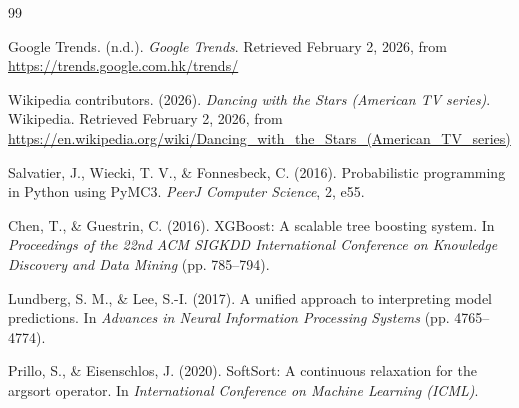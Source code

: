 
\begin{thebibliography}{99}%
\setlength{\itemsep}{0pt}
\setlength{\parsep}{0pt}
\setlength{\parskip}{0pt}

Google Trends. (n.d.). 
\textit{Google Trends}. 
Retrieved February 2, 2026, from \url{https://trends.google.com.hk/trends/}

Wikipedia contributors. (2026). 
\textit{Dancing with the Stars (American TV series)}. 
Wikipedia. Retrieved February 2, 2026, from \url{https://en.wikipedia.org/wiki/Dancing_with_the_Stars_(American_TV_series)}

Salvatier, J., Wiecki, T. V., \& Fonnesbeck, C. (2016).
Probabilistic programming in Python using PyMC3.
\textit{PeerJ Computer Science}, 2, e55.

Chen, T., \& Guestrin, C. (2016).
XGBoost: A scalable tree boosting system.
In \textit{Proceedings of the 22nd ACM SIGKDD International Conference on Knowledge Discovery and Data Mining} (pp. 785--794).

Lundberg, S. M., \& Lee, S.-I. (2017).
A unified approach to interpreting model predictions.
In \textit{Advances in Neural Information Processing Systems} (pp. 4765--4774).

Prillo, S., \& Eisenschlos, J. (2020).
SoftSort: A continuous relaxation for the argsort operator.
In \textit{International Conference on Machine Learning (ICML)}.


\end{thebibliography}

